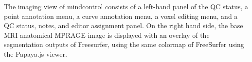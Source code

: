 \label{fig:imagingview}
The imaging view of mindcontrol consists of a left-hand panel of the QC status, a point annotation menu, a curve annotation menu, a voxel editing menu, and a QC status, notes, and editor assignment panel. On the right hand side, the base MRI anatomical MPRAGE image is displayed with an overlay of the segmentation outputs of Freesurfer, using the same colormap of FreeSurfer using the Papaya.js viewer. 